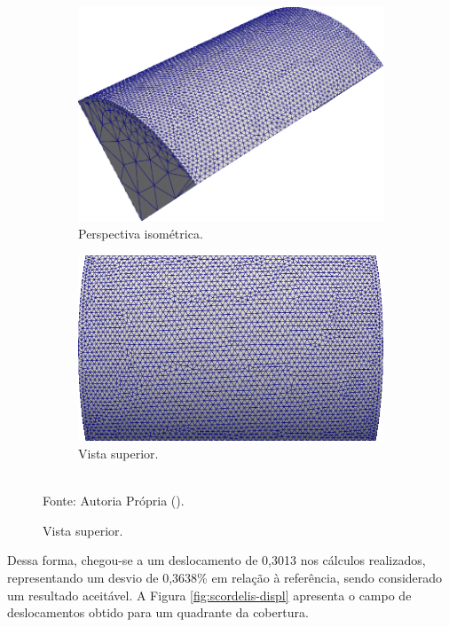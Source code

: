 \begin{figure}[h!]
    \centering
    \caption{Malha utilizada na simulação de \textit{Scordelis-Lo roof}.}
    \begin{subfigure}{0.49\textwidth}
    \includegraphics[width=\linewidth]{Figuras/scordelis/malha1.png}
    \caption{Perspectiva isométrica.}
    \end{subfigure}
    \begin{subfigure}{0.49\textwidth}
    \includegraphics[width=\linewidth]{Figuras/scordelis/malha2.png}
    \caption{Vista superior.}
    \end{subfigure}
    \\Fonte: Autoria Própria (\the\year).
    \label{fig:scordelis-mesh}
\end{figure}

Dessa forma, chegou-se a um deslocamento de 0,3013 nos cálculos realizados, representando um desvio de 0,3638\% em relação à referência, sendo considerado um resultado aceitável. A Figura \ref{fig:scordelis-displ} apresenta o campo de deslocamentos obtido para um quadrante da cobertura.

